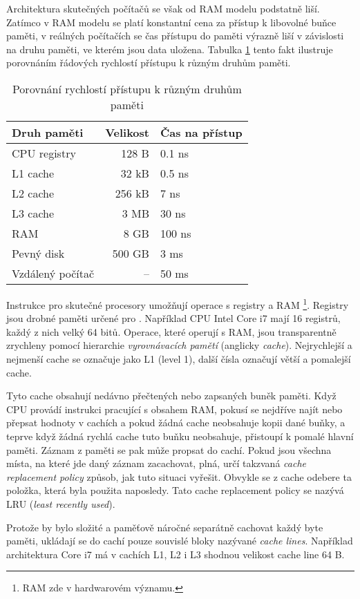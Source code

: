 Architektura skutečných počítačů se však od RAM modelu podstatně liší.
Zatímco v RAM modelu se platí konstantní cena za přístup k libovolné buňce
paměti, v reálných počítačích se čas přístupu do paměti výrazně liší
v závislosti na druhu paměti, ve kterém jsou data uložena.
Tabulka \ref{tbl:speeds} tento fakt ilustruje porovnáním
řádových rychlostí přístupu k různým druhům paměti.

\begin{table}
	\centering
	\begin{tabular}{l|r|l}
	Druh paměti & Velikost & Čas na přístup \\
	\hline
	CPU registry & 128 B & 0.1 ns \\
	L1 cache & 32 kB & 0.5 ns \\
	L2 cache & 256 kB & 7 ns \\
	L3 cache & 3 MB & 30 ns \\
	RAM & 8 GB & 100 ns \\
	Pevný disk & 500 GB & 3 ms \\
	Vzdálený počítač & -- & 50 ms
	\end{tabular}
	\caption{Porovnání rychlostí přístupu k různým druhům paměti}
	\label{tbl:speeds}
\end{table}

Instrukce pro skutečné procesory umožňují operace s registry a RAM
\footnote{RAM zde v hardwarovém významu.}.
Registry jsou drobné paměti určené pro . Například CPU
Intel Core i7 mají 16 registrů, každý z nich velký 64 bitů.
Operace, které operují s RAM, jsou transparentně zrychleny pomocí hierarchie
\textit{vyrovnávacích pamětí} (anglicky \textit{cache}).
Nejrychlejší a nejmenší cache se označuje jako L1 (level 1), další čísla
označují větší a pomalejší cache.

Tyto cache obsahují  nedávno přečtených nebo zapsaných buněk
paměti.  Když CPU provádí instrukci pracující s obsahem RAM, pokusí se nejdříve
najít nebo přepsat hodnoty v cachích a pokud žádná cache neobsahuje kopii dané
buňky, a teprve když žádná rychlá cache tuto buňku neobsahuje, přistoupí k
pomalé hlavní paměti. Záznam z paměti se pak může propsat do cachí. Pokud jsou
všechna místa, na které jde daný záznam zacachovat, plná, určí takzvaná
\textsl{cache replacement policy} způsob, jak tuto situaci vyřešit. Obvykle
se z cache odebere ta položka, která byla použita naposledy. Tato cache
replacement policy se nazývá LRU (\textit{least recently used}).

Protože by bylo složité a paměťově náročné separátně cachovat každý byte paměti,
ukládají se do cachí pouze souvislé bloky nazývané \textsl{cache lines}.
Například architektura Core i7 má v cachích L1, L2 i L3 shodnou velikost cache
line 64 B.


